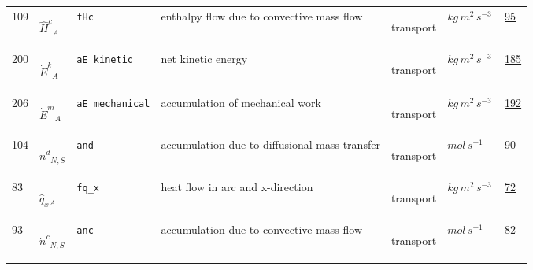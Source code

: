 \begin{longtable}{|p{1cm}|p{2.5cm}|p{4.5cm}|p{8cm}|p{3.0cm}|p{3cm}|p{1cm}|}
                 \\
            109
             & \hypertarget{"v:109"}{ $ {{\hat{H}^c}}{_{A}} $}
             & \verb|fHc|
             & enthalpy flow due to convective mass flow
             & \begin{lay}transport \end{lay}
             & $ kg \,m^{2} \,s^{-3} \, $
             &                 \hyperlink{"e:95"}{ 95 }
                 \\
            200
             & \hypertarget{"v:200"}{ $ {{\dot{E}^k}}{_{A}} $}
             & \verb|aE_kinetic|
             & net kinetic energy
             & \begin{lay}transport \end{lay}
             & $ kg \,m^{2} \,s^{-3} \, $
             &                 \hyperlink{"e:185"}{ 185 }
                 \\
            206
             & \hypertarget{"v:206"}{ $ {{\dot{E}^m}}{_{A}} $}
             & \verb|aE_mechanical|
             & accumulation of mechanical work
             & \begin{lay}transport \end{lay}
             & $ kg \,m^{2} \,s^{-3} \, $
             &                 \hyperlink{"e:192"}{ 192 }
                 \\
            104
             & \hypertarget{"v:104"}{ $ {{\dot{n}^d}}{_{N, S}} $}
             & \verb|and|
             & accumulation due to diffusional mass transfer
             & \begin{lay}transport \end{lay}
             & $ mol \,s^{-1} \, $
             &                 \hyperlink{"e:90"}{ 90 }
                 \\
            83
             & \hypertarget{"v:83"}{ $ {{\hat{q}_x}}{_{A}} $}
             & \verb|fq_x|
             & heat flow in arc and x-direction
             & \begin{lay}transport \end{lay}
             & $ kg \,m^{2} \,s^{-3} \, $
             &                 \hyperlink{"e:72"}{ 72 }
                 \\
            93
             & \hypertarget{"v:93"}{ $ {{\dot{n}^c}}{_{N, S}} $}
             & \verb|anc|
             & accumulation due to convective mass flow
             & \begin{lay}transport \end{lay}
             & $ mol \,s^{-1} \, $
             &                 \hyperlink{"e:82"}{ 82 }

\end{longtable}
